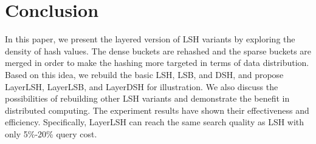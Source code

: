 
\section{Conclusion}
\label{sec:conclusion}

In this paper, we present the layered version of LSH variants by exploring the density of hash values. The dense buckets are rehashed and the sparse buckets are merged in order to make the hashing more targeted in terms of data distribution. Based on this idea, we rebuild the basic LSH, LSB, and DSH, and propose LayerLSH, LayerLSB, and LayerDSH for illustration. We also discuss the possibilities of rebuilding other LSH variants and demonstrate the benefit in distributed computing. The experiment results have shown their effectiveness and efficiency. Specifically, LayerLSH can reach the same search quality as LSH with only 5\%-20\% query cost.

